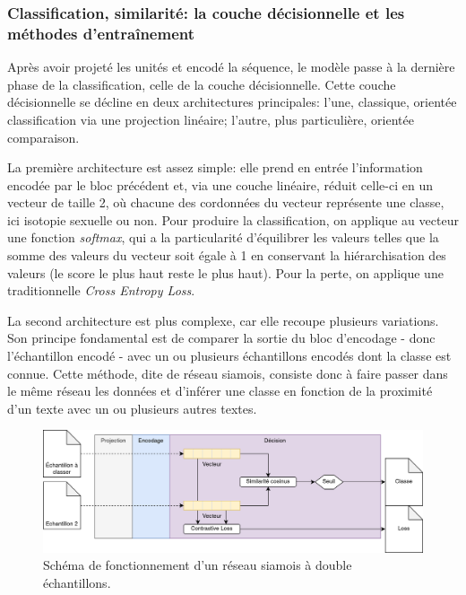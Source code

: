 \subsubsection{Classification, similarité: la couche décisionnelle et les méthodes d'entraînement}

Après avoir projeté les unités et encodé la séquence, le modèle passe à la dernière phase de la classification, celle de la couche décisionnelle. Cette couche décisionnelle se décline en deux architectures principales: l'une, classique, orientée classification via une projection linéaire; l'autre, plus particulière, orientée comparaison.

La première architecture est assez simple: elle prend en entrée l'information encodée par le bloc précédent et, via une couche linéaire, réduit celle-ci en un vecteur de taille 2, où chacune des cordonnées du vecteur représente une classe, ici isotopie sexuelle ou non. Pour produire la classification, on applique au vecteur une fonction \textit{softmax}, qui a la particularité d'équilibrer les valeurs telles que la somme des valeurs du vecteur soit égale à 1 en conservant la hiérarchisation des valeurs (le score le plus haut reste le plus haut). Pour la perte, on applique une traditionnelle \textit{Cross Entropy Loss}.

La second architecture est plus complexe, car elle recoupe plusieurs variations. Son principe fondamental est de comparer la sortie du bloc d'encodage - donc l'échantillon encodé - avec un ou plusieurs échantillons encodés dont la classe est connue. Cette méthode, dite de réseau siamois, consiste donc à faire passer dans le même réseau les données et d'inférer une classe en fonction de la proximité d'un texte avec un ou plusieurs autres textes. 


\begin{figure}[ht]
    \centering
    \includegraphics[width=\linewidth]{figures/chap4/contrastive.png}
    \caption{Schéma de fonctionnement d'un réseau siamois à double échantillons.}
    \label{fig:chap4:reseau:ContrastiveLoss}
\end{figure}


